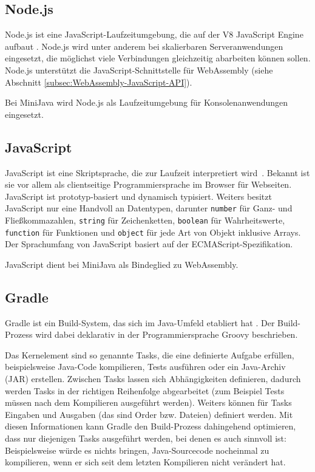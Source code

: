 \subsection{Node.js}
Node.js ist eine JavaScript-Laufzeitumgebung, die auf der V8 JavaScript Engine aufbaut \cite{NodeJSDocumentation}. Node.js wird unter anderem bei skalierbaren Serveranwendungen eingesetzt, die möglichst viele Verbindungen gleichzeitig abarbeiten können sollen. Node.js unterstützt die JavaScript-Schnittstelle für WebAssembly (siehe Abschnitt \ref{subsec:WebAssembly-JavaScript-API}).

Bei MiniJava wird Node.js als Laufzeitumgebung für Konsolenanwendungen eingesetzt.

\subsection{JavaScript}
JavaScript ist eine Skriptsprache, die zur Laufzeit interpretiert wird \cite{MDNJavaScript}. Bekannt ist sie vor allem als clientseitige Programmiersprache im Browser für Webseiten. JavaScript ist prototyp-basiert und dynamisch typisiert. Weiters besitzt JavaScript nur eine Handvoll an Datentypen, darunter \lstinline{number} für Ganz- und Fließkommazahlen, \lstinline{string} für Zeichenketten, \lstinline{boolean} für Wahrheitswerte, \lstinline{function} für Funktionen und \lstinline{object} für jede Art von Objekt inklusive Arrays. Der Sprachumfang von JavaScript basiert auf der ECMAScript-Spezifikation.

JavaScript dient bei MiniJava als Bindeglied zu WebAssembly.

\subsection{Gradle}
Gradle ist ein Build-System, das sich im Java-Umfeld etabliert hat \cite{Gradle}. Der Build-Prozess wird dabei deklarativ in der Programmiersprache Groovy beschrieben.

Das Kernelement sind so genannte Tasks, die eine definierte Aufgabe erfüllen, beispielsweise Java-Code kompilieren, Tests ausführen oder ein Java-Archiv (JAR) erstellen. Zwischen Tasks lassen sich Abhängigkeiten definieren, dadurch werden Tasks in der richtigen Reihenfolge abgearbeitet (zum Beispiel Tests müssen nach dem Kompilieren ausgeführt werden). Weiters können für Tasks Eingaben und Ausgaben (das sind Order bzw. Dateien) definiert werden. Mit diesen Informationen kann Gradle den Build-Prozess dahingehend optimieren, dass nur diejenigen Tasks ausgeführt werden, bei denen es auch sinnvoll ist: Beispielsweise würde es nichts bringen, Java-Sourcecode nocheinmal zu kompilieren, wenn er sich seit dem letzten Kompilieren nicht verändert hat.

